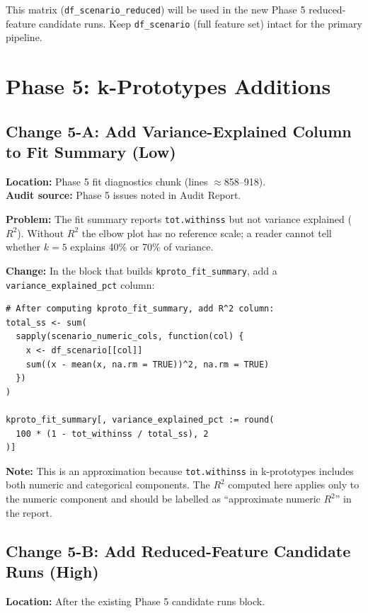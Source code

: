 \documentclass[11pt]{article}
\newcommand{\rcode}[1]{\texttt{#1}}
\begin{document}
This matrix (\rcode{df\_scenario\_reduced}) will be used in the new Phase 5
reduced-feature candidate runs. Keep \rcode{df\_scenario} (full feature set)
intact for the primary pipeline.

\section{Phase 5: k-Prototypes Additions}

\subsection{Change 5-A: Add Variance-Explained Column to Fit Summary (Low)}

\textbf{Location:} Phase 5 fit diagnostics chunk (lines $\approx$858--918).\\
\textbf{Audit source:} Phase 5 issues noted in Audit Report.

\textbf{Problem:} The fit summary reports \rcode{tot.withinss} but not
variance explained ($R^2$). Without $R^2$ the elbow plot has no reference
scale; a reader cannot tell whether $k=5$ explains 40\% or 70\% of variance.

\textbf{Change:} In the block that builds \rcode{kproto\_fit\_summary},
add a \rcode{variance\_explained\_pct} column:

\begin{lstlisting}
# After computing kproto_fit_summary, add R^2 column:
total_ss <- sum(
  sapply(scenario_numeric_cols, function(col) {
    x <- df_scenario[[col]]
    sum((x - mean(x, na.rm = TRUE))^2, na.rm = TRUE)
  })
)

kproto_fit_summary[, variance_explained_pct := round(
  100 * (1 - tot_withinss / total_ss), 2
)]
\end{lstlisting}

\textbf{Note:} This is an approximation because \rcode{tot.withinss} in
k-prototypes includes both numeric and categorical components. The $R^2$
computed here applies only to the numeric component and should be
labelled as ``approximate numeric $R^2$'' in the report.

\subsection{Change 5-B: Add Reduced-Feature Candidate Runs (High)}

\textbf{Location:} After the existing Phase 5 candidate runs block.
\end{document}

